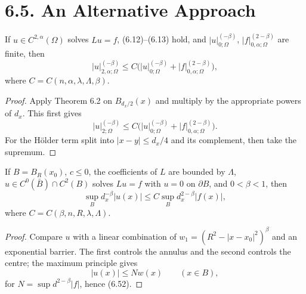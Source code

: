\section*{6.5. An Alternative Approach}

\begin{lemma}
\label{gt-ch06-lem-6-20}
If $u\in C^{2,\alpha}(\Omega)$ solves $Lu=f$, (6.12)--(6.13) hold, and
$|u|_{0;\Omega}^{(-\beta)}$, $|f|_{0,\alpha;\Omega}^{(2-\beta)}$ are finite, then
\begin{equation}\tag{6.50}
|u|_{2,\alpha;\Omega}^{(-\beta)}
\le C\bigl(|u|_{0;\Omega}^{(-\beta)}+|f|_{0,\alpha;\Omega}^{(2-\beta)}\bigr),
\end{equation}
where $C=C(n,\alpha,\lambda,\Lambda,\beta)$.
\end{lemma}
\begin{proof}
\sketch Apply Theorem 6.2 on $B_{d_x/2}(x)$ and multiply by the appropriate
powers of $d_x$. This first gives
\begin{equation}
\tag{6.51}
|u|_{2;\Omega}^{(-\beta)}
\leq C\bigl(|u|_{0;\Omega}^{(-\beta)}
+|f|_{0,\alpha;\Omega}^{(2-\beta)}\bigr).
\end{equation}
For the H\"older term split into $|x-y|\le d_x/4$ and its
complement, then take the supremum.
\end{proof}

\begin{lemma}
\label{gt-ch06-lem-6-21}
If $B=B_R(x_0)$, $c\le0$, the coefficients of $L$ are bounded by $\Lambda$,
$u\in C^0(\bar B)\cap C^2(B)$ solves $Lu=f$ with $u=0$ on $\partial B$, and
$0<\beta<1$, then
\begin{equation}\tag{6.52}
\sup_B d_x^{-\beta}|u(x)|\le C\sup_B d_x^{2-\beta}|f(x)|,
\end{equation}
where $C=C(\beta,n,R,\lambda,\Lambda)$.
\end{lemma}
\begin{proof}
\sketch Compare $u$ with a linear combination of
$w_1=(R^2-|x-x_0|^2)^\beta$ and an exponential barrier.  The first controls
the annulus and the second controls the centre; the maximum principle gives
\begin{equation}
\tag{6.53}
|u(x)|\leq Nw(x)\qquad(x\in B),
\end{equation}
for $N=\sup d^{2-\beta}|f|$, hence (6.52).
\end{proof}

